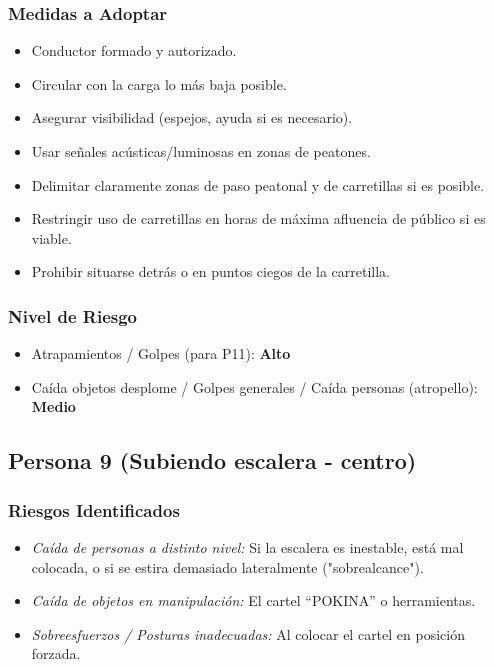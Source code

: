 \documentclass[12pt,a4paper]{article}
\begin{document}
	\subsubsection{Medidas a Adoptar}
	\begin{itemize}
		\item Conductor formado y autorizado.
		\item Circular con la carga lo más baja posible.
		\item Asegurar visibilidad (espejos, ayuda si es necesario).
		\item Usar señales acústicas/luminosas en zonas de peatones.
		\item Delimitar claramente zonas de paso peatonal y de carretillas si es posible.
		\item Restringir uso de carretillas en horas de máxima afluencia de público si es viable.
		\item Prohibir situarse detrás o en puntos ciegos de la carretilla.
	\end{itemize}
	
	\subsubsection{Nivel de Riesgo}
	\begin{itemize}
		\item Atrapamientos / Golpes (para P11): \textbf{Alto}
		\item Caída objetos desplome / Golpes generales / Caída personas (atropello): \textbf{Medio}
	\end{itemize}
	
	\bigskip\hrulefill\bigskip
	
	\subsection{Persona 9 (Subiendo escalera - centro)}
	
	\subsubsection{Riesgos Identificados}
	\begin{itemize}
		\item \textit{Caída de personas a distinto nivel:} Si la escalera es inestable, está mal colocada, o si se estira demasiado lateralmente ("sobrealcance").
		\item \textit{Caída de objetos en manipulación:} El cartel ``POKINA'' o herramientas.
		\item \textit{Sobreesfuerzos / Posturas inadecuadas:} Al colocar el cartel en posición forzada.
	\end{itemize}
	
\end{document}
